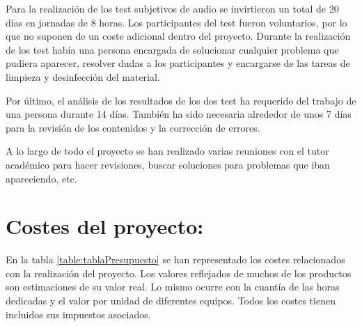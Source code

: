 \documentclass[11pt,a4paper]{book}
\begin{document}
        Para la realización de los test subjetivos de audio se invirtieron un total de 20 días en jornadas de 8 horas. Los participantes del test fueron voluntarios, por lo que no suponen de un coste adicional dentro del proyecto. Durante la realización de los test había una persona encargada de solucionar cualquier problema que pudiera aparecer, resolver dudas a los participantes y encargarse de las tareas de limpieza y desinfección del material.
        
        Por último, el análisis de los resultados de los dos test ha requerido del trabajo de una persona durante 14 días. También ha sido necesaria alrededor de unos 7 días para la revisión de los contenidos y la corrección de errores.
        
        A lo largo de todo el proyecto se han realizado varias reuniones con el tutor académico para hacer revisiones, buscar soluciones para problemas que iban apareciendo, etc.
        
    \section*{Costes del proyecto:}
        En la tabla \ref{table:tablaPresupuesto} se han representado los costes relacionados con la realización del proyecto. Los valores reflejados de muchos de los productos son estimaciones de su valor real. Lo mismo ocurre con la cuantía de las horas dedicadas y el valor por unidad de diferentes equipos. Todos los costes tienen incluidos sus impuestos asociados.
        
\end{document}
